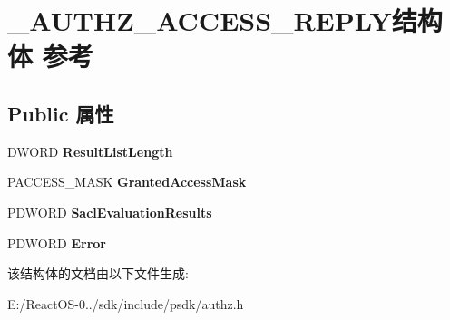 \hypertarget{struct___a_u_t_h_z___a_c_c_e_s_s___r_e_p_l_y}{}\section{\+\_\+\+A\+U\+T\+H\+Z\+\_\+\+A\+C\+C\+E\+S\+S\+\_\+\+R\+E\+P\+L\+Y结构体 参考}
\label{struct___a_u_t_h_z___a_c_c_e_s_s___r_e_p_l_y}
\subsection*{Public 属性}
\begin{DoxyCompactItemize}
\item 
\mbox{\label{struct___a_u_t_h_z___a_c_c_e_s_s___r_e_p_l_y_a497d7015c3b397803fc6c1674294fafb}} 
D\+W\+O\+RD {\bfseries Result\+List\+Length}
\item 
\mbox{\label{struct___a_u_t_h_z___a_c_c_e_s_s___r_e_p_l_y_a6a16cc16a9bf5a84f39488f1e56b9117}} 
P\+A\+C\+C\+E\+S\+S\+\_\+\+M\+A\+SK {\bfseries Granted\+Access\+Mask}
\item 
\mbox{\label{struct___a_u_t_h_z___a_c_c_e_s_s___r_e_p_l_y_a6a704cbcf94e3cd4965a0af60176d1ff}} 
P\+D\+W\+O\+RD {\bfseries Sacl\+Evaluation\+Results}
\item 
\mbox{\label{struct___a_u_t_h_z___a_c_c_e_s_s___r_e_p_l_y_a4e2c417428d7eeec16b0a6a7c3a2e36c}} 
P\+D\+W\+O\+RD {\bfseries Error}
\end{DoxyCompactItemize}


该结构体的文档由以下文件生成\+:\begin{DoxyCompactItemize}
\item 
E\+:/\+React\+O\+S-\/0../sdk/include/psdk/authz.\+h\end{DoxyCompactItemize}
